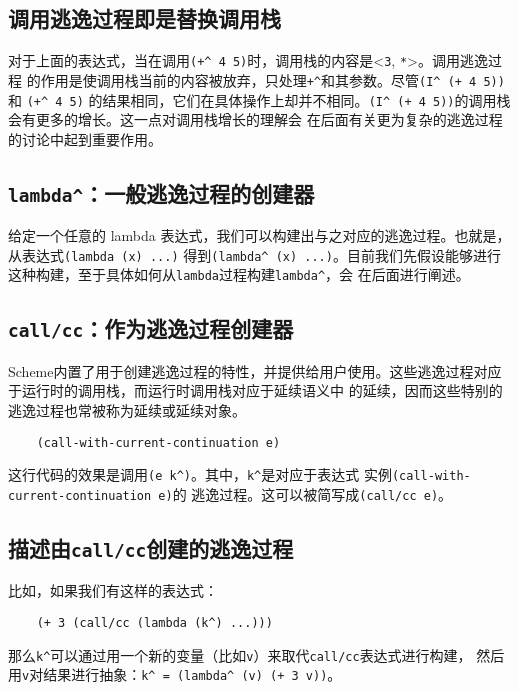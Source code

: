 \documentclass[12pt]{article}
\begin{document}
\subsection{调用逃逸过程即是替换调用栈}
\indent{}对于上面的表达式，当在调用\texttt{(+\^{} 4 5)}时，调用栈的内容是<\texttt{3}, \texttt{*}>。调用逃逸过程
的作用是使调用栈当前的内容被放弃，只处理\texttt{+\^{}}和其参数。尽管\texttt{(I\^{} (+ 4 5))} 和 \texttt{(+\^{} 4 5)}
的结果相同，它们在具体操作上却并不相同。\texttt{(I\^{} (+ 4 5))}的调用栈会有更多的增长。这一点对调用栈增长的理解会
在后面有关更为复杂的逃逸过程的讨论中起到重要作用。

\subsection{\texttt{lambda\^{}}：一般逃逸过程的创建器}
\indent{}给定一个任意的 lambda 表达式，我们可以构建出与之对应的逃逸过程。也就是，从表达式\texttt{(lambda (x) ...)}
得到\texttt{(lambda\^{} (x) ...)}。目前我们先假设能够进行这种构建，至于具体如何从\texttt{lambda}过程构建\texttt{lambda\^{}}，会
在后面进行阐述。

\subsection{\texttt{call/cc}：作为逃逸过程创建器}
\indent{}Scheme内置了用于创建逃逸过程的特性，并提供给用户使用。这些逃逸过程对应于运行时的调用栈，而运行时调用栈对应于延续语义中
的延续，因而这些特别的逃逸过程也常被称为延续或延续对象。
\begin{verbatim}
    (call-with-current-continuation e)
\end{verbatim}
\noindent{}这行代码的效果是调用\texttt{(e k\^{})}。其中，\texttt{k\^{}}是对应于表达式
实例\texttt{(call-with-current-continuation e)}的 逃逸过程。这可以被简写成\texttt{(call/cc e)}。

\subsection{描述由\texttt{call/cc}创建的逃逸过程}
\noindent{}比如，如果我们有这样的表达式：
\begin{verbatim}
    (+ 3 (call/cc (lambda (k^) ...)))
\end{verbatim}
\noindent{}那么\texttt{k\^{}}可以通过用一个新的变量（比如\texttt{v}）来取代\texttt{call/cc}表达式进行构建，
然后用\texttt{v}对结果进行抽象：\texttt{k\^{} = (lambda\^{} (v) (+ 3 v))}。
\end{document}
